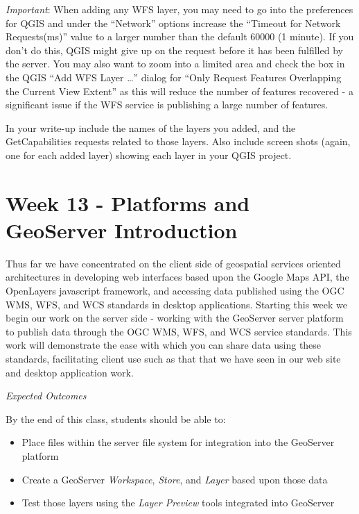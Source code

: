 \documentclass[]{book}
\providecommand{\tightlist}{%
  \setlength{\itemsep}{0pt}\setlength{\parskip}{0pt}}
\begin{document}
\emph{Important}: When adding any WFS layer, you may need to go into the
preferences for QGIS and under the ``Network'' options increase the
``Timeout for Network Requests(ms)'' value to a larger number than the
default 60000 (1 minute). If you don't do this, QGIS might give up on
the request before it has been fulfilled by the server. You may also
want to zoom into a limited area and check the box in the QGIS ``Add WFS
Layer \ldots{}'' dialog for ``Only Request Features Overlapping the
Current View Extent'' as this will reduce the number of features
recovered - a significant issue if the WFS service is publishing a large
number of features.

In your write-up include the names of the layers you added, and the
GetCapabilities requests related to those layers. Also include screen
shots (again, one for each added layer) showing each layer in your QGIS
project.  

\chapter{Week 13 - Platforms and GeoServer Introduction}\label{week13}

Thus far we have concentrated on the client side of geospatial services
oriented architectures in developing web interfaces based upon the
Google Maps API, the OpenLayers javascript framework, and accessing data
published using the OGC WMS, WFS, and WCS standards in desktop
applications. Starting this week we begin our work on the server side -
working with the GeoServer server platform to publish data through the
OGC WMS, WFS, and WCS service standards. This work will demonstrate the
ease with which you can share data using these standards, facilitating
client use such as that that we have seen in our web site and desktop
application work.

\emph{Expected Outcomes}

By the end of this class, students should be able to:

\begin{itemize}
\tightlist
\item
  Place files within the server file system for integration into the
  GeoServer platform
\item
  Create a GeoServer \emph{Workspace}, \emph{Store}, and \emph{Layer}
  based upon those data
\item
  Test those layers using the \emph{Layer Preview} tools integrated into
  GeoServer
\end{itemize}
\end{document}
